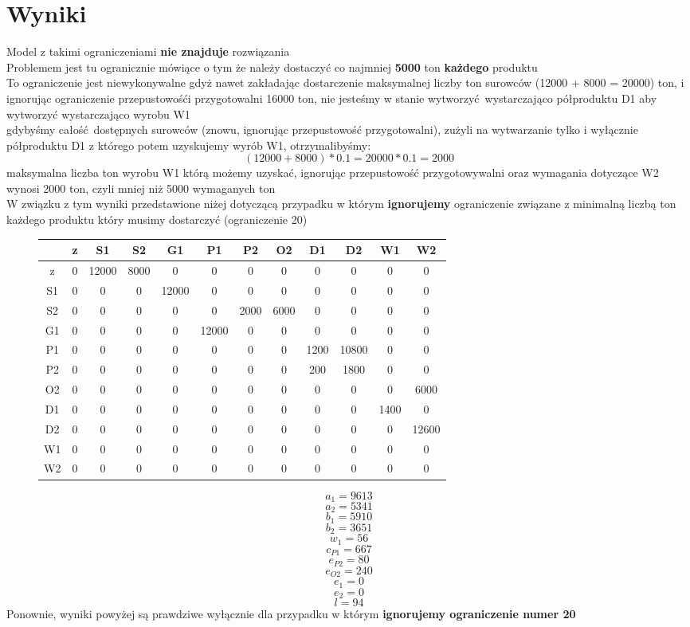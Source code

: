 \section{Wyniki}
Model z takimi ograniczeniami \textbf{nie znajduje} rozwiązania \\
Problemem jest tu ogranicznie mówiące o tym że należy dostaczyć co najmniej \textbf{5000} ton \textbf{każdego} produktu \\
To ograniczenie jest niewykonywalne gdyż nawet zakładając dostarczenie maksymalnej liczby ton surowców (12000 + 8000 = 20000) ton, i ignorując ograniczenie przepustowośći przygotowalni 16000 ton, nie jesteśmy w stanie wytworzyć wystarczająco półproduktu D1 aby wytworzyć wystarczająco wyrobu W1 \\ 
gdybyśmy całość dostępnych surowców (znowu, ignorując przepustowość przygotowalni), zużyli na wytwarzanie tylko i wyłącznie półproduktu D1 z którego potem uzyskujemy wyrób W1, otrzymalibyśmy: 
\[ (12000 + 8000) * 0.1 = 20000 * 0.1 = 2000 \]
maksymalna liczba ton wyrobu W1 którą możemy uzyskać, ignorując przepustowość przygotowywalni oraz wymagania dotyczące W2 wynosi 2000 ton, czyli mniej niż 5000 wymaganych ton \\
W związku z tym wyniki przedstawione niżej dotyczącą przypadku w którym \textbf{ignorujemy} ograniczenie związane z minimalną liczbą ton każdego produktu który musimy dostarczyć (ograniczenie 20) \\
\begin{figure}[H]
\caption{}
\begin{tabular}{|c|c|c|c|c|c|c|c|c|c|c|c|}
\hline
 & 	z & S1 & S2 & G1 & P1 & P2 & O2 & D1 & D2 & W1 & W2 \\
\hline
z &	0 & 12000 & 8000 & 0 & 0 & 0 & 0 & 0 & 0 & 0 & 0 \\
\hline
S1 &	0 & 0 & 0 & 12000 & 0 & 0 & 0 & 0 & 0 & 0 & 0 \\
\hline
S2 &	0 & 0 & 0 & 0 & 0 & 2000 & 6000 & 0 & 0 & 0 & 0 \\
\hline
G1 &	0 & 0 & 0 & 0 & 12000 & 0 & 0 & 0 & 0 & 0 & 0 \\
\hline
P1 &	0 & 0 & 0 & 0 & 0 & 0 & 0 & 1200 & 10800 & 0 & 0 \\
\hline
P2 &	0 & 0 & 0 & 0 & 0 & 0 & 0 & 200 & 1800 & 0 & 0 \\
\hline
O2 &	0 & 0 & 0 & 0 & 0 & 0 & 0 & 0 & 0 & 0 & 6000 \\
\hline
D1 &	0 & 0 & 0 & 0 & 0 & 0 & 0 & 0 & 0 & 1400 & 0 \\
\hline
D2 &	0 & 0 & 0 & 0 & 0 & 0 & 0 & 0 & 0 & 0 & 12600 \\
\hline
W1 &	0 & 0 & 0 & 0 & 0 & 0 & 0 & 0 & 0 & 0 & 0 \\
\hline
W2 &	0 & 0 & 0 & 0 & 0 & 0 & 0 & 0 & 0 & 0 & 0 \\
\hline

\end{tabular}
\end{figure}

\[ a_1 = 9613 \]
\[ a_2 = 5341 \]
\[ b_1 = 5910 \]
\[ b_2 = 3651 \]
\[ w_1 = 56 \]
\[ c_{P1} = 667 \]
\[ e_{P2} = 80 \]
\[ e_{O2} = 240 \]
\[ e_1 = 0 \]
\[ e_2 = 0 \]
\[ l = 94 \]
Ponownie, wyniki powyżej są prawdziwe wyłącznie dla przypadku w którym \textbf{ignorujemy ograniczenie numer 20}

